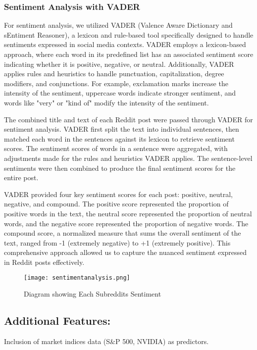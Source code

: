 \subsubsection{Sentiment Analysis with VADER}
For sentiment analysis, we utilized VADER (Valence Aware Dictionary and sEntiment Reasoner), a lexicon and rule-based tool specifically designed to handle sentiments expressed in social media contexts. VADER employs a lexicon-based approach, where each word in its predefined list has an associated sentiment score indicating whether it is positive, negative, or neutral. Additionally, VADER applies rules and heuristics to handle punctuation, capitalization, degree modifiers, and conjunctions. For example, exclamation marks increase the intensity of the sentiment, uppercase words indicate stronger sentiment, and words like "very" or "kind of" modify the intensity of the sentiment.

The combined title and text of each Reddit post were passed through VADER for sentiment analysis. VADER first split the text into individual sentences, then matched each word in the sentences against its lexicon to retrieve sentiment scores. The sentiment scores of words in a sentence were aggregated, with adjustments made for the rules and heuristics VADER applies. The sentence-level sentiments were then combined to produce the final sentiment scores for the entire post.

VADER provided four key sentiment scores for each post: positive, neutral, negative, and compound. The positive score represented the proportion of positive words in the text, the neutral score represented the proportion of neutral words, and the negative score represented the proportion of negative words. The compound score, a normalized measure that sums the overall sentiment of the text, ranged from -1 (extremely negative) to +1 (extremely positive). This comprehensive approach allowed us to capture the nuanced sentiment expressed in Reddit posts effectively.

\begin{figure}[h]
    \centering
    \texttt{[image: sentimentanalysis.png]}
    \caption{Diagram showing Each Subreddits Sentiment}
    \label{fig:example-image}
\end{figure}


\subsection{Additional Features:} Inclusion of market indices data (S\&P 500, NVIDIA) as predictors.


